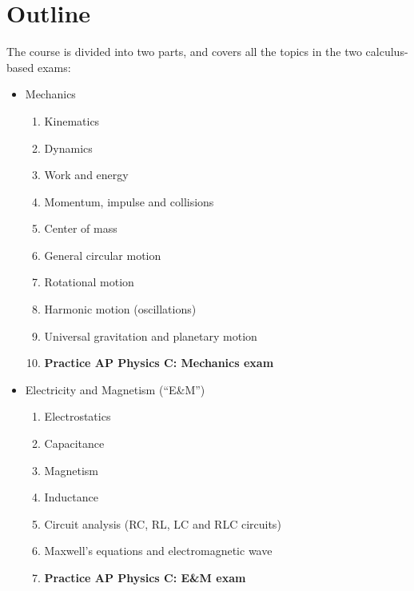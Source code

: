 \documentclass{../../oss-handout}
\begin{document}
\section*{Outline}
The course is divided into two parts, and covers all the topics in the two
calculus-based exams:
\begin{itemize}[nosep]
\item Mechanics
  \begin{enumerate}[nosep]
  \item Kinematics
  \item Dynamics
  \item Work and energy
  \item Momentum, impulse and collisions
  \item Center of mass
  \item General circular motion
  \item Rotational motion
  \item Harmonic motion (oscillations)
  \item Universal gravitation and planetary motion
  \item\textbf{Practice AP Physics C: Mechanics exam}
  \end{enumerate}
\item Electricity and Magnetism (``E\&M'')
  \begin{enumerate}[noitemsep,topsep=0pt,resume]
  \item Electrostatics
  \item Capacitance
  \item Magnetism
  \item Inductance
  \item Circuit analysis (RC, RL, LC and RLC circuits)
  \item Maxwell's equations and electromagnetic wave
  \item\textbf{Practice AP Physics C: E\&M exam}
  \end{enumerate}
\end{itemize}
\end{document}
